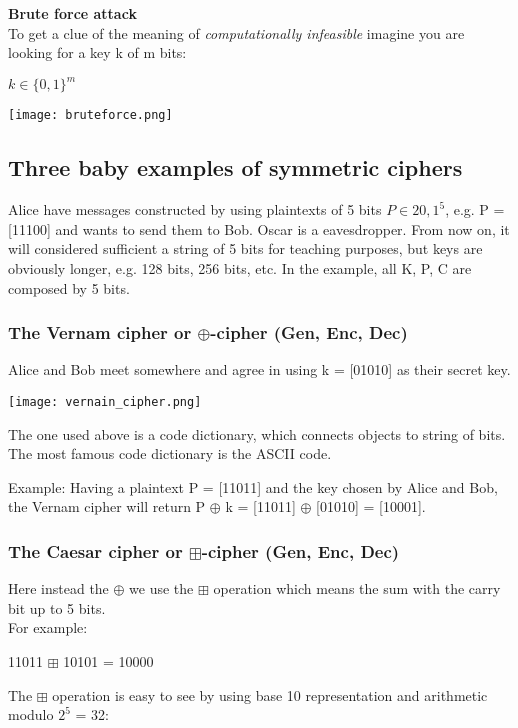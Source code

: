 \documentclass{article}
\begin{document}
\textbf{Brute force attack}\\
To get a clue of the meaning of \textit{computationally infeasible} imagine you are looking for a key k of m bits:
\begin{center}
$k \in \{0,1\}^\textit{m}$
\end{center}

\texttt{[image: bruteforce.png]}

\subsection{Three baby examples of symmetric ciphers}

Alice have messages constructed by using plaintexts of 5 bits $P \in 2 {0,1}^5$, e.g. P = [11100] and wants to send them to Bob. Oscar is a eavesdropper. From now on, it will considered sufficient a string of 5 bits for teaching purposes, but keys are obviously longer, e.g. 128 bits, 256 bits, etc.
In the example, all K, P, C are composed by 5 bits.

\subsubsection{The Vernam cipher or $\oplus$-cipher (Gen, Enc, Dec)}
Alice and Bob meet somewhere and agree in using k = [01010] as their secret key.


\begin{center}
\texttt{[image: vernain\_cipher.png]}
\end{center}


The one used above is a code dictionary, which connects objects to string of bits. The most famous code dictionary is the ASCII code.

Example: Having a plaintext P = [11011] and the key chosen by Alice and Bob, the Vernam cipher will return P $\oplus$ k = [11011] $\oplus$ [01010] = [10001].

\subsubsection{The Caesar cipher or $\boxplus$-cipher (Gen, Enc, Dec)}
Here instead the $\oplus$ we use the $\boxplus$ operation which means the sum with the carry bit up to 5 bits.\\
For example:
\begin{center}
11011 $\boxplus$ 10101 = 10000
\end{center}
The $\boxplus$ operation is easy to see by using base 10 representation and arithmetic modulo $2^5$ = 32:
\end{document}
